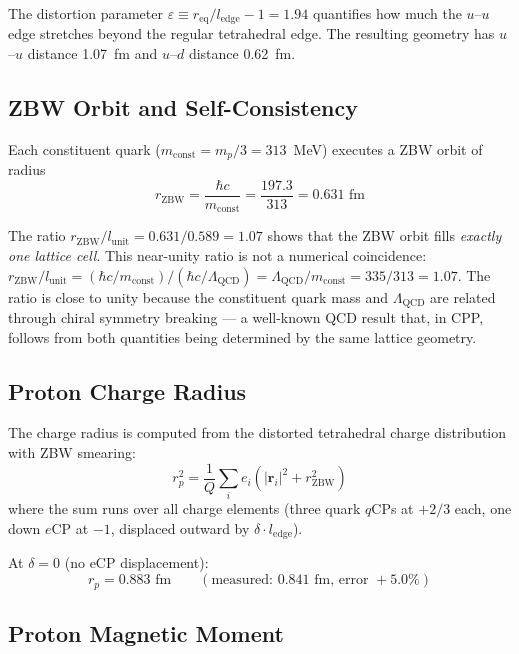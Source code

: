 \documentclass[12pt,a4paper]{article}
\begin{document}
The distortion parameter $\varepsilon \equiv r_{\mathrm{eq}}/l_{\mathrm{edge}} - 1 = 1.94$ quantifies how much the $u$--$u$ edge stretches beyond the regular tetrahedral edge. The resulting geometry has $u$--$u$ distance 1.07~fm and $u$--$d$ distance 0.62~fm.

\subsection{ZBW Orbit and Self-Consistency}

Each constituent quark ($m_{\mathrm{const}} = m_p/3 = 313$~MeV) executes a ZBW orbit of radius
\begin{equation}
r_{\mathrm{ZBW}} = \frac{\hbar c}{m_{\mathrm{const}}} = \frac{197.3}{313} = 0.631 \text{ fm}
\end{equation}

The ratio $r_{\mathrm{ZBW}}/l_{\mathrm{unit}} = 0.631/0.589 = 1.07$ shows that the ZBW orbit fills \emph{exactly one lattice cell}. This near-unity ratio is not a numerical coincidence: $r_{\mathrm{ZBW}}/l_{\mathrm{unit}} = (\hbar c/m_{\mathrm{const}})/(\hbar c/\Lambda_{\mathrm{QCD}}) = \Lambda_{\mathrm{QCD}}/m_{\mathrm{const}} = 335/313 = 1.07$. The ratio is close to unity because the constituent quark mass and $\Lambda_{\mathrm{QCD}}$ are related through chiral symmetry breaking --- a well-known QCD result that, in CPP, follows from both quantities being determined by the same lattice geometry.

\subsection{Proton Charge Radius}

The charge radius is computed from the distorted tetrahedral charge distribution with ZBW smearing:
\begin{equation}
r_p^2 = \frac{1}{Q}\sum_i e_i\left(|\mathbf{r}_i|^2 + r_{\mathrm{ZBW}}^2\right)
\end{equation}
where the sum runs over all charge elements (three quark $q$CPs at $+2/3$ each, one down $e$CP at $-1$, displaced outward by $\delta \cdot l_{\mathrm{edge}}$).

At $\delta = 0$ (no eCP displacement):
\begin{equation}
r_p = 0.883 \text{ fm} \qquad (\text{measured: } 0.841 \text{ fm, error } +5.0\%)
\end{equation}

\subsection{Proton Magnetic Moment}
\end{document}
